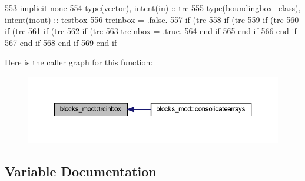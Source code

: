 \begin{DoxyCode}
553     \textcolor{keywordtype}{implicit none}
554     \textcolor{keywordtype}{type}(vector), \textcolor{keywordtype}{intent(in)} :: trc
555     \textcolor{keywordtype}{type}(boundingbox\_class), \textcolor{keywordtype}{intent(inout)} :: testbox
556     trcinbox = .false.
557     \textcolor{keywordflow}{if} (trc%
558         \textcolor{keywordflow}{if} (trc%
559             \textcolor{keywordflow}{if} (trc%
560                 \textcolor{keywordflow}{if} (trc%
561                     \textcolor{keywordflow}{if} (trc%
562                         \textcolor{keywordflow}{if} (trc%
563                             trcinbox = .true.
564 \textcolor{keywordflow}{                        end if}
565 \textcolor{keywordflow}{                    end if}
566 \textcolor{keywordflow}{                end if}
567 \textcolor{keywordflow}{            end if}
568 \textcolor{keywordflow}{        end if}
569 \textcolor{keywordflow}{    end if}
\end{DoxyCode}
Here is the caller graph for this function\+:\nopagebreak
\begin{figure}[H]
\begin{center}
\leavevmode
\includegraphics[width=350pt]{namespaceblocks__mod_ad8d92210b3d4ade090d2a19b97f4c88e_icgraph}
\end{center}
\end{figure}


\subsection{Variable Documentation}
\mbox{\label{namespaceblocks__mod_a13b3fc755dfbf3e333490a3f931b28aa}} 
